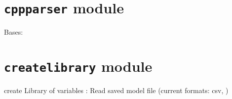 \documentclass[letterpaper,10pt,english]{sphinxmanual}
\begin{document}
\begin{fulllineitems}

\begin{fulllineitems}
\label{eqparse:eqparse.baseparse.BaseParse.write}
\end{fulllineitems}


\begin{fulllineitems}
\label{eqparse:eqparse.baseparse.BaseParse.write_comment}
\end{fulllineitems}


\end{fulllineitems}



\section{\texttt{cppparser} module}
\label{eqparse:module-eqparse.cppparser}\label{eqparse:cppparser-module}

\begin{fulllineitems}
\label{eqparse:eqparse.cppparser.CppParser}
Bases: {\hyperref[eqparse:eqparse.baseparse.BaseParse]{}}

\begin{fulllineitems}
\label{eqparse:eqparse.cppparser.CppParser.cpp_original}
\end{fulllineitems}


\end{fulllineitems}



\section{\texttt{createlibrary} module}
\label{eqparse:createlibrary-module}\label{eqparse:module-eqparse.createlibrary}
create Library of variables : Read saved model file (current formats: csv, )
\end{document}
